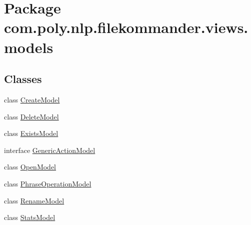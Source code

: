 \hypertarget{namespacecom_1_1poly_1_1nlp_1_1filekommander_1_1views_1_1models}{\section{Package com.\-poly.\-nlp.\-filekommander.\-views.\-models}
\label{namespacecom_1_1poly_1_1nlp_1_1filekommander_1_1views_1_1models}
}
\subsection*{Classes}
\begin{DoxyCompactItemize}
\item 
class \hyperlink{classcom_1_1poly_1_1nlp_1_1filekommander_1_1views_1_1models_1_1_create_model}{Create\-Model}
\item 
class \hyperlink{classcom_1_1poly_1_1nlp_1_1filekommander_1_1views_1_1models_1_1_delete_model}{Delete\-Model}
\item 
class \hyperlink{classcom_1_1poly_1_1nlp_1_1filekommander_1_1views_1_1models_1_1_exists_model}{Exists\-Model}
\item 
interface \hyperlink{interfacecom_1_1poly_1_1nlp_1_1filekommander_1_1views_1_1models_1_1_generic_action_model}{Generic\-Action\-Model}
\item 
class \hyperlink{classcom_1_1poly_1_1nlp_1_1filekommander_1_1views_1_1models_1_1_open_model}{Open\-Model}
\item 
class \hyperlink{classcom_1_1poly_1_1nlp_1_1filekommander_1_1views_1_1models_1_1_phrase_operation_model}{Phrase\-Operation\-Model}
\item 
class \hyperlink{classcom_1_1poly_1_1nlp_1_1filekommander_1_1views_1_1models_1_1_rename_model}{Rename\-Model}
\item 
class \hyperlink{classcom_1_1poly_1_1nlp_1_1filekommander_1_1views_1_1models_1_1_stats_model}{Stats\-Model}
\end{DoxyCompactItemize}
